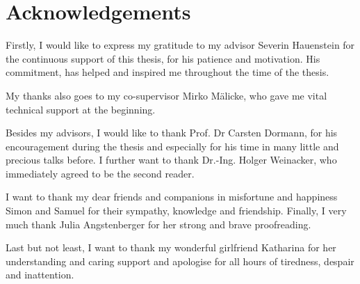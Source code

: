 \chapter*{Acknowledgements}

\label{ch:Acknowledgements}


Firstly, I would like to express my gratitude to my advisor Severin Hauenstein for the continuous support of this thesis, for his patience and motivation. His commitment, has helped and inspired me throughout the time of the thesis.

My thanks also goes to my co-supervisor Mirko Mälicke, who gave me vital technical support at the beginning.

Besides my advisors, I would like to thank Prof. Dr Carsten Dormann, for his encouragement during the thesis and especially for his time in many little and precious talks before. 
I further want to thank Dr.-Ing. Holger Weinacker, who immediately agreed to be the second reader.

I want to thank my dear friends and companions in misfortune and happiness Simon and Samuel for their sympathy, knowledge and friendship.
Finally, I very much thank Julia Angstenberger for her strong and brave proofreading.

Last but not least, I want to thank my wonderful girlfriend Katharina for her understanding and caring support and apologise for all hours of tiredness, despair and inattention.








